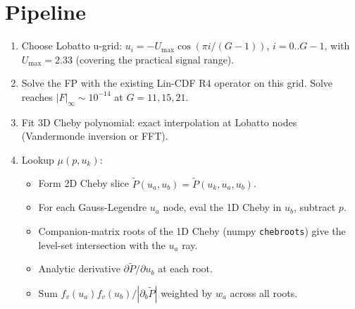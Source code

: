 \documentclass[11pt]{article}
\begin{document}
\begin{abstract}
\textbf{Practical recommendations.}
\begin{enumerate}
  \item For \emph{smooth-regime} cells (low $\tau$, low $\gamma$): the
        Cheby-Lobatto-analytic-contour pipeline is a reasonable production
        path; expect $\sim 1/G^4$ for sufficiently smooth $P$.
  \item For \emph{sharp-regime} cells (high $\tau$ near 1, intermediate $\gamma$):
        Cheby gives algebraic convergence only. Strict-h=0 + POU (existing
        path) is at the same accuracy class with $O(G^3)$ work per Phi
        instead of root-finding overhead.
  \item For pursuing machine-eps lookups in the sharp regime, the deepest
        approach would be \textbf{detect the smoothness barrier} (locate
        the kinks/cusps of the level set) and integrate the kink
        contribution separately (Gauss-Kronrod adaptive quadrature, or
        analytic kink residuals). Substantial follow-up; not in this report.
\end{enumerate}
\end{abstract}

\section{Pipeline}

\begin{enumerate}
  \item Choose Lobatto u-grid: $u_i = -U_{\max} \cos(\pi i / (G-1))$, $i=0..G-1$,
        with $U_{\max} = 2.33$ (covering the practical signal range).
  \item Solve the FP with the existing Lin-CDF R4 operator on this grid.
        Solve reaches $|F|_\infty \sim 10^{-14}$ at $G{=}11, 15, 21$.
  \item Fit 3D Cheby polynomial: exact interpolation at Lobatto nodes
        (Vandermonde inversion or FFT).
  \item Lookup $\mu(p, u_k)$:
        \begin{itemize}
          \item Form 2D Cheby slice $\tilde P(u_a, u_b) = \tilde P(u_k, u_a, u_b)$.
          \item For each Gauss-Legendre $u_a$ node, eval the 1D Cheby in $u_b$,
                subtract $p$.
          \item Companion-matrix roots of the 1D Cheby (numpy
                \texttt{chebroots}) give the level-set intersection with
                the $u_a$ ray.
          \item Analytic derivative $\partial \tilde P / \partial u_b$ at each
                root.
          \item Sum $f_v(u_a) f_v(u_b)/|\partial_b \tilde P|$ weighted by
                $w_a$ across all roots.
        \end{itemize}
\end{enumerate}
\end{document}
